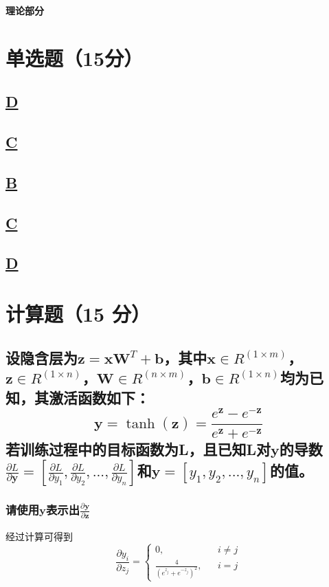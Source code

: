 \documentclass[a4paper]{article}
\begin{document}
\courseheader
{}
\vspace{3mm}
\centerline{\textbf{\Large{理论部分}}}

\section{单选题（15分）}
\subsection{\underline{D}}

\subsection{\underline{C}}

\subsection{\underline{B}}

\subsection{\underline{C}}

\subsection{\underline{D}}

\section{计算题（15 分）}
\subsection{设隐含层为$\mathbf{z}=\mathbf{x}\mathbf{W}^T+\mathbf{b}$，其中$\mathbf{x}\in R^{(1 \times m)}$，$\mathbf{z}\in R^{(1\times n)}$，$\mathbf{W}\in R^{(n\times m)}$，$\mathbf{b} \in R^{(1\times n)}$均为已知，其激活函数如下：
$$\mathbf{y}=\tanh(\mathbf{z})=\frac{e^\mathbf{z}-e^{-\mathbf{z}}}{e^\mathbf{z}+e^{-\mathbf{z}}}$$
若训练过程中的目标函数为L，且已知L对$\mathbf{y}$的导数 $\frac{\partial L}{\partial \mathbf{y}}=[\frac{\partial L}{\partial y_1},\frac{\partial L}{\partial y_2},...,\frac{\partial L}{\partial y_n}]$和$\mathbf{y}=[y_1,y_2,...,y_n]$的值。
}
\subsubsection{请使用$\mathbf{y}$表示出$\frac{\partial \mathbf{y}}{\partial \mathbf{z}}$
}
经过计算可得到
$$
\frac{\partial y_i}{\partial z_j} = 
    \left\{ 
        \begin{array}{lcl}
        0, & &i \neq j\\
        \frac{4}{\left( e^{z_j}+e^{-z_j} \right)^2}, & &i = j
        \end{array}
    \right.
$$
\end{document}
